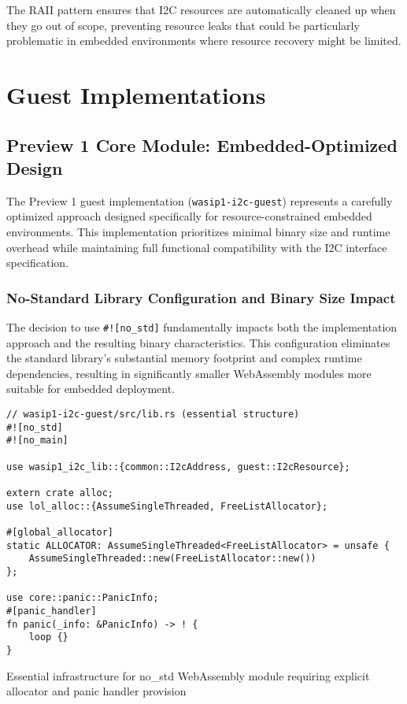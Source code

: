The RAII pattern ensures that I2C resources are automatically cleaned up when they go out of scope, preventing resource leaks that could be particularly problematic in embedded environments where resource recovery might be limited.

\section{Guest Implementations}
\label{sec:guest-implementations}

\subsection{Preview 1 Core Module: Embedded-Optimized Design}

The Preview 1 guest implementation (\texttt{wasip1-i2c-guest}) represents a carefully optimized approach designed specifically for resource-constrained embedded environments. This implementation prioritizes minimal binary size and runtime overhead while maintaining full functional compatibility with the I2C interface specification.

\subsubsection{No-Standard Library Configuration and Binary Size Impact}

The decision to use \texttt{\#![no\_std]} fundamentally impacts both the implementation approach and the resulting binary characteristics. This configuration eliminates the standard library's substantial memory footprint and complex runtime dependencies, resulting in significantly smaller WebAssembly modules more suitable for embedded deployment.

\begin{listing}[H]
\begin{verbatim}
// wasip1-i2c-guest/src/lib.rs (essential structure)
#![no_std]
#![no_main]

use wasip1_i2c_lib::{common::I2cAddress, guest::I2cResource};

extern crate alloc;
use lol_alloc::{AssumeSingleThreaded, FreeListAllocator};

#[global_allocator]
static ALLOCATOR: AssumeSingleThreaded<FreeListAllocator> = unsafe {
    AssumeSingleThreaded::new(FreeListAllocator::new())
};

use core::panic::PanicInfo;
#[panic_handler]
fn panic(_info: &PanicInfo) -> ! {
    loop {}
}
\end{verbatim}
\caption{Essential infrastructure for no\_std WebAssembly module requiring explicit allocator and panic handler provision}
\label{lst:no-std-infrastructure}
\end{listing}

